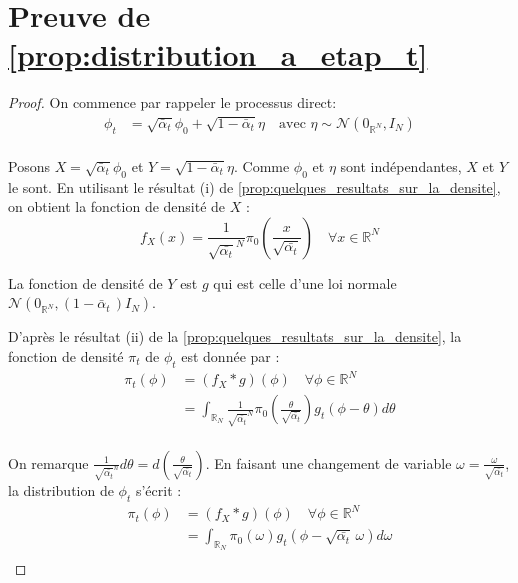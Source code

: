 \documentclass[a4paper,10pt]{article}
\theoremstyle{definition} %
\theoremstyle{definition} %
\theoremstyle{definition} %
\theoremstyle{definition} %
\newcommand{\E}[1]{\mathbb{E}\left[#1\right]}
\newcommand{\R}{\mathbb{R}}
\begin{document}
\section{Preuve de \cref{prop:distribution_a_etap_t}} \label{sec:proof_distribution_a_etap_t}
\begin{proof}
    On commence par rappeler le processus direct:
    \begin{align*}
    \phi_t &= \sqrt{\bar \alpha_t}\phi_0 + \sqrt{1-\bar \alpha_t} \eta \quad \text{avec } \eta \sim \mathcal{N}(0_{\R^N},I_N)\\
    \end{align*}

    Posons $X = \sqrt{\bar \alpha_t}\phi_0$ et $Y = \sqrt{1-\bar \alpha_t} \eta$. Comme $\phi_0$ et $\eta$ sont indépendantes, $X$ et $Y$ le sont. En utilisant le résultat (i) de \cref{prop:quelques_resultats_sur_la_densite}, on obtient la fonction de densité de $X$ :
    \[f_X(x) = \frac{1}{\sqrt{\bar{\alpha_t}}^N} \pi_0\left(\frac{x}{\sqrt{\bar{\alpha_t}}}\right) \quad\forall x \in \R^N\]

    La fonction de densité de $Y$ est $g$ qui est celle d'une loi normale $\mathcal{N}\left(0_{\R^N}, (1-\bar \alpha _t\,)I_N\right)$.

    D'après le résultat (ii) de la  \cref{prop:quelques_resultats_sur_la_densite}, la fonction de densité $\pi_t$ de $\phi_t$ est donnée par :
    \begin{align*}
        \pi_t(\phi) &= (f_X*g)(\phi) \quad \forall\phi\in \R^N \\
        &= \int_{\R_N} \frac{1}{\sqrt{\bar{\alpha_t}}^N} \pi_0\left(\frac{\theta}{\sqrt{\bar{\alpha_t}}}\right) g_t(\phi -\theta) d\theta\\
    \end{align*}

    On remarque $\frac{1}{\sqrt{\bar{\alpha_t}}^n} d\theta = d\left(\frac{\theta}{\sqrt{\bar{\alpha_t}}}\right)$. En faisant une changement de variable $\omega = \frac{\omega}{\sqrt{\bar{\alpha_t}}}$, la distribution de $\phi_t$ s'écrit :
    \begin{align*}
        \pi_t(\phi) &= (f_X*g)(\phi) \quad \forall\phi\in \R^N \\
        &= \int_{\R_N}  \pi_0(\omega) g_t(\phi -\sqrt{\bar{\alpha_t}}\,\omega) d\omega\\
    \end{align*}
\end{proof}

\end{document}
